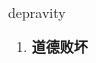 
\begin{frame}
{\huge depravity}
\begin{center}
\begin{enumerate}\Large
  \item \textbf{道德败坏}
\end{enumerate}
\end{center}
\end{frame}
